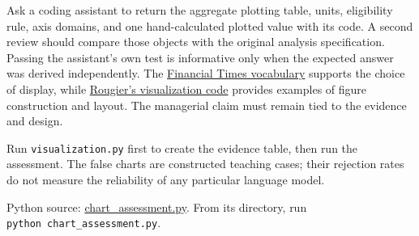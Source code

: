 Ask a coding assistant to return the aggregate plotting table, units,
eligibility rule, axis domains, and one hand-calculated plotted value
with its code. A second review should compare those objects with the
original analysis specification. Passing the assistant's own test is
informative only when the expected answer was derived independently. The
\href{https://github.com/Financial-Times/chart-doctor/blob/main/visual-vocabulary/README.md}{Financial
Times vocabulary} supports the choice of display, while
\href{https://github.com/rougier/scientific-visualization-book}{Rougier's
visualization code} provides examples of figure construction and layout.
The managerial claim must remain tied to the evidence and design.

Run \texttt{visualization.py} first to create the evidence table, then
run the assessment. The false charts are constructed teaching cases;
their rejection rates do not measure the reliability of any particular
language model.

\FloatBarrier
{}
Python source:
\href{../03_Data_and_Code/mHealth/recurring_examples/chart_assessment.py}{chart\_assessment.py}.
From its directory, run \texttt{python\ chart\_assessment.py}.

